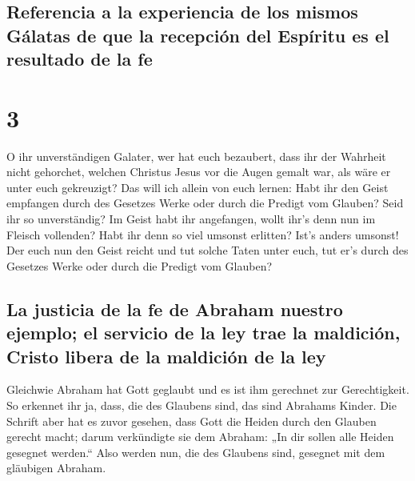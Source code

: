 \hypertarget{referencia-a-la-experiencia-de-los-mismos-guxe1latas-de-que-la-recepciuxf3n-del-espuxedritu-es-el-resultado-de-la-fe}{%
\subsection{Referencia a la experiencia de los mismos Gálatas de que la
recepción del Espíritu es el resultado de la
fe}\label{referencia-a-la-experiencia-de-los-mismos-guxe1latas-de-que-la-recepciuxf3n-del-espuxedritu-es-el-resultado-de-la-fe}}

\hypertarget{section-2}{%
\section{3}\label{section-2}}

 O ihr unverständigen Galater, wer hat euch bezaubert,
dass ihr der Wahrheit nicht gehorchet, welchen Christus Jesus vor die
Augen gemalt war, als wäre er unter euch gekreuzigt?  Das
will ich allein von euch lernen: Habt ihr den Geist empfangen durch des
Gesetzes Werke oder durch die Predigt vom Glauben?  Seid
ihr so unverständig? Im Geist habt ihr angefangen, wollt ihr's denn nun
im Fleisch vollenden?  Habt ihr denn so viel umsonst
erlitten? Ist's anders umsonst!  Der euch nun den Geist
reicht und tut solche Taten unter euch, tut er's durch des Gesetzes
Werke oder durch die Predigt vom Glauben?

\hypertarget{la-justicia-de-la-fe-de-abraham-nuestro-ejemplo-el-servicio-de-la-ley-trae-la-maldiciuxf3n-cristo-libera-de-la-maldiciuxf3n-de-la-ley}{%
\subsection{La justicia de la fe de Abraham nuestro ejemplo; el servicio
de la ley trae la maldición, Cristo libera de la maldición de la
ley}\label{la-justicia-de-la-fe-de-abraham-nuestro-ejemplo-el-servicio-de-la-ley-trae-la-maldiciuxf3n-cristo-libera-de-la-maldiciuxf3n-de-la-ley}}

 Gleichwie Abraham hat Gott geglaubt und es ist ihm
gerechnet zur Gerechtigkeit.  So erkennet ihr ja, dass,
die des Glaubens sind, das sind Abrahams Kinder.  Die
Schrift aber hat es zuvor gesehen, dass Gott die Heiden durch den
Glauben gerecht macht; darum verkündigte sie dem Abraham: „In dir sollen
alle Heiden gesegnet werden.``  Also werden nun, die des
Glaubens sind, gesegnet mit dem gläubigen Abraham.

